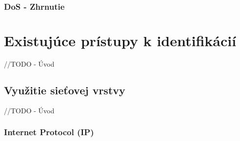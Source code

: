 \documentclass[
  printed, %
  table,   %
  lof,     %
  lot,     %
]{fithesis3}
\begin{document}


\subsection{DoS - Zhrnutie}




\chapter{Existujúce prístupy k identifikácií}
\label{ch:existing}
//TODO - Úvod
\section{Využitie sieťovej vrstvy}
//TODO - Úvod
\subsection{Internet Protocol (IP)}
\end{document}
